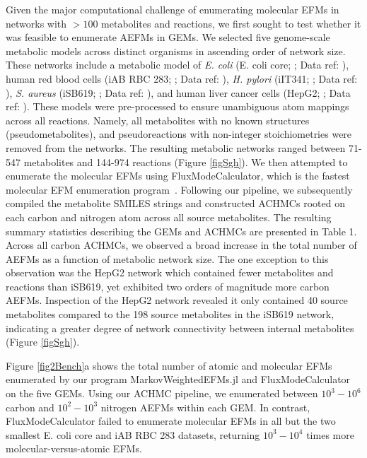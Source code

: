 \documentclass[12pt]{article}
\begin{document}
Given the major computational challenge of enumerating molecular EFMs in
networks with $>100$ metabolites and reactions, we first sought to test
whether it was feasible to enumerate AEFMs in GEMs. We selected five
genome-scale metabolic models across distinct organisms in ascending order
of network size. These networks include a metabolic model of \textit{E.
coli} (E. coli core; \citealt{OrthJeffreyD2010RaUo}; Data ref:
\citealt{OrthJeffreyD2010RaUoDATASET}), human red blood cells (iAB RBC
283; \citealt{BordbarAarash2011iApd}; Data ref:
\citealt{BordbarAarash2011iApdDATASET}), \textit{H. pylori} (iIT341;
\citealt{ThieleInes2005EMRo}; Data ref:
\citealt{ThieleInes2005EMRoDATASET}), \textit{S. aureus} (iSB619;
\citealt{BeckerScottA2005Grot}; Data ref:
\citealt{BeckerScottA2005GrotDATASET}), and human liver cancer cells
(HepG2; \citealt{NilssonAvlant2020Qaoa}; Data ref:
\citealt{NilssonAvlant2020QaoaDATASET}). These models were pre-processed
to ensure unambiguous atom mappings across all reactions. Namely, all
metabolites with no known structures (pseudometabolites), and
pseudoreactions with non-integer stoichiometries were removed from the
networks. The resulting metabolic networks ranged between 71-547
metabolites and 144-974 reactions (Figure \ref{figSgh}). We then attempted to
enumerate the molecular EFMs using FluxModeCalculator, which is the
fastest molecular EFM enumeration
program~\citep{vanKlinkenJanBert2016Faet}. Following our pipeline, we
subsequently compiled the metabolite SMILES strings and constructed ACHMCs
rooted on each carbon and nitrogen atom across all source metabolites. The
resulting summary statistics describing the GEMs and ACHMCs are presented
in Table 1. Across all carbon ACHMCs, we observed a broad increase in the
total number of AEFMs as a function of metabolic network size. The one
exception to this observation was the HepG2 network which contained fewer
metabolites and reactions than iSB619, yet exhibited two orders of
magnitude more carbon AEFMs. Inspection of the HepG2 network revealed it
only contained 40 source metabolites compared to the 198 source
metabolites in the iSB619 network, indicating a greater degree of network
connectivity between internal metabolites (Figure \ref{figSgh}).

Figure \ref{fig2Bench}a shows the total number of atomic and molecular
EFMs enumerated by our program MarkovWeightedEFMs.jl and
FluxModeCalculator on the five GEMs. Using our ACHMC pipeline, we
enumerated between $10^3 - 10^6$ carbon and $10^2-10^3$ nitrogen AEFMs
within each GEM. In contrast, FluxModeCalculator failed to enumerate
molecular EFMs in all but the two smallest E. coli core and iAB RBC 283
datasets, returning $10^3 - 10^4$ times more molecular-versus-atomic EFMs. 
\end{document}
